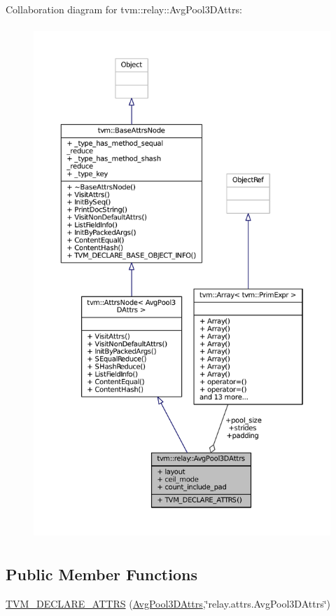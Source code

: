 Collaboration diagram for tvm\+:\+:relay\+:\+:Avg\+Pool3\+D\+Attrs\+:
\nopagebreak
\begin{figure}[H]
\begin{center}
\leavevmode
\includegraphics[height=550pt]{structtvm_1_1relay_1_1AvgPool3DAttrs__coll__graph}
\end{center}
\end{figure}
\subsection*{Public Member Functions}
\begin{DoxyCompactItemize}
\item 
\hyperlink{structtvm_1_1relay_1_1AvgPool3DAttrs_a9b4f7206134885bc978cea1d9adcf643}{T\+V\+M\+\_\+\+D\+E\+C\+L\+A\+R\+E\+\_\+\+A\+T\+T\+RS} (\hyperlink{structtvm_1_1relay_1_1AvgPool3DAttrs}{Avg\+Pool3\+D\+Attrs},\char`\"{}relay.\+attrs.\+Avg\+Pool3\+D\+Attrs\char`\"{})
\end{DoxyCompactItemize}
